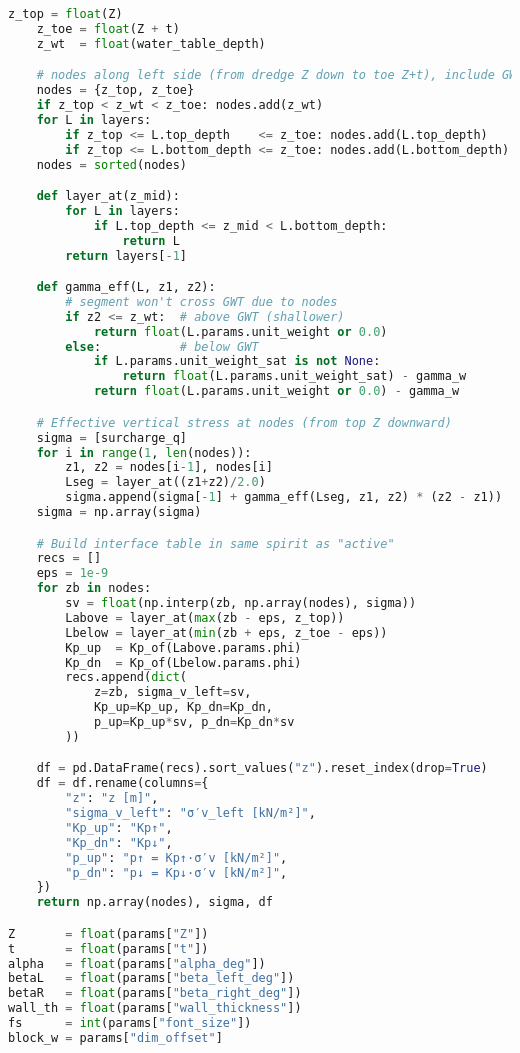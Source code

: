 \begin{lstlisting}[language=Python]
    z_top = float(Z)
    z_toe = float(Z + t)
    z_wt  = float(water_table_depth)

    # nodes along left side (from dredge Z down to toe Z+t), include GWT if inside
    nodes = {z_top, z_toe}
    if z_top < z_wt < z_toe: nodes.add(z_wt)
    for L in layers:
        if z_top <= L.top_depth    <= z_toe: nodes.add(L.top_depth)
        if z_top <= L.bottom_depth <= z_toe: nodes.add(L.bottom_depth)
    nodes = sorted(nodes)

    def layer_at(z_mid):
        for L in layers:
            if L.top_depth <= z_mid < L.bottom_depth:
                return L
        return layers[-1]

    def gamma_eff(L, z1, z2):
        # segment won't cross GWT due to nodes
        if z2 <= z_wt:  # above GWT (shallower)
            return float(L.params.unit_weight or 0.0)
        else:           # below GWT
            if L.params.unit_weight_sat is not None:
                return float(L.params.unit_weight_sat) - gamma_w
            return float(L.params.unit_weight or 0.0) - gamma_w

    # Effective vertical stress at nodes (from top Z downward)
    sigma = [surcharge_q]
    for i in range(1, len(nodes)):
        z1, z2 = nodes[i-1], nodes[i]
        Lseg = layer_at((z1+z2)/2.0)
        sigma.append(sigma[-1] + gamma_eff(Lseg, z1, z2) * (z2 - z1))
    sigma = np.array(sigma)

    # Build interface table in same spirit as "active"
    recs = []
    eps = 1e-9
    for zb in nodes:
        sv = float(np.interp(zb, np.array(nodes), sigma))
        Labove = layer_at(max(zb - eps, z_top))
        Lbelow = layer_at(min(zb + eps, z_toe - eps))
        Kp_up  = Kp_of(Labove.params.phi)
        Kp_dn  = Kp_of(Lbelow.params.phi)
        recs.append(dict(
            z=zb, sigma_v_left=sv,
            Kp_up=Kp_up, Kp_dn=Kp_dn,
            p_up=Kp_up*sv, p_dn=Kp_dn*sv
        ))

    df = pd.DataFrame(recs).sort_values("z").reset_index(drop=True)
    df = df.rename(columns={
        "z": "z [m]",
        "sigma_v_left": "σ′v_left [kN/m²]",
        "Kp_up": "Kp↑",
        "Kp_dn": "Kp↓",
        "p_up": "p↑ = Kp↑·σ′v [kN/m²]",
        "p_dn": "p↓ = Kp↓·σ′v [kN/m²]",
    })
    return np.array(nodes), sigma, df

Z       = float(params["Z"])
t       = float(params["t"])
alpha   = float(params["alpha_deg"])
betaL   = float(params["beta_left_deg"])
betaR   = float(params["beta_right_deg"])
wall_th = float(params["wall_thickness"])
fs      = int(params["font_size"])
block_w = params["dim_offset"]


\end{lstlisting}
